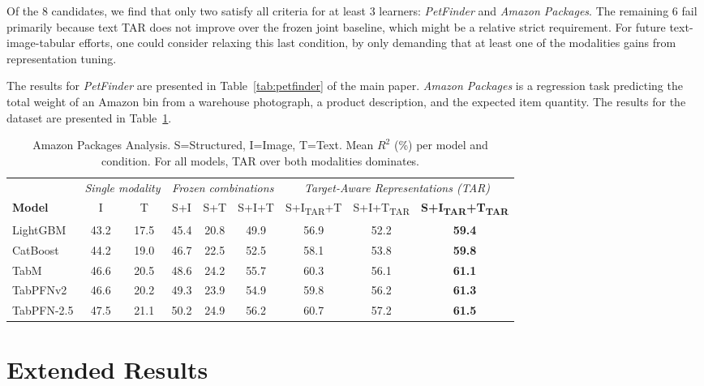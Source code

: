 \documentclass{llmxive}
\begin{document}
Of the 8 candidates, we find that only two satisfy all criteria for at least 3 learners: \textit{PetFinder} and \textit{Amazon Packages}. The remaining 6 fail primarily because text TAR does not improve over the frozen joint baseline, which might be a relative strict requirement. For future text-image-tabular efforts, one could consider relaxing this last condition, by only demanding that at least one of the modalities gains from representation tuning.

The results for \textit{PetFinder} are presented in Table~\ref{tab:petfinder} of the main paper. \textit{Amazon Packages} is a regression task predicting the total weight of an Amazon bin from a warehouse photograph, a product description, and the expected item quantity. The results for the dataset are presented in Table~\ref{tab:amazon_packages}.

\begin{table}[ht]
\centering
\setlength{\tabcolsep}{4pt}
\small
\begin{tabular}{l cc ccc ccc}
\toprule
 & \multicolumn{2}{c}{\textit{Single modality}} & \multicolumn{3}{c}{\textit{Frozen combinations}} & \multicolumn{3}{c}{\textit{Target-Aware Representations (TAR)}} \\
\cmidrule(lr){2-3}\cmidrule(lr){4-6}\cmidrule(lr){7-9}
\textbf{Model} & I & T & S+I & S+T & S+I+T & S+I\textsubscript{TAR}+T & S+I+T\textsubscript{TAR} & \textbf{S+I\textsubscript{TAR}+T\textsubscript{TAR}} \\
\midrule
LightGBM   & 43.2 & 17.5 & 45.4 & 20.8 & 49.9 & 56.9 & 52.2 & \textbf{59.4} \\
CatBoost   & 44.2 & 19.0 & 46.7 & 22.5 & 52.5 & 58.1 & 53.8 & \textbf{59.8} \\
TabM       & 46.6 & 20.5 & 48.6 & 24.2 & 55.7 & 60.3 & 56.1 & \textbf{61.1} \\
TabPFNv2   & 46.6 & 20.2 & 49.3 & 23.9 & 54.9 & 59.8 & 56.2 & \textbf{61.3} \\
TabPFN-2.5 & 47.5 & 21.1 & 50.2 & 24.9 & 56.2 & 60.7 & 57.2 & \textbf{61.5} \\
\bottomrule
\end{tabular}
\caption{Amazon Packages Analysis. S=Structured, I=Image, T=Text. Mean $R^2$ (\%) per model and condition. For all models, TAR over both modalities dominates.}
\label{tab:amazon_packages}
\end{table}


\section{Extended Results}
\label{app:extended_results}
\end{document}
